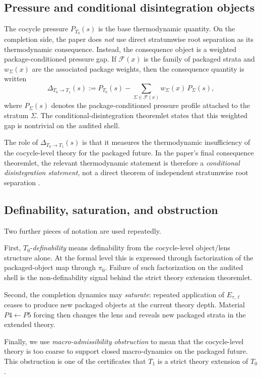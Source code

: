 \documentclass[11pt]{article}
\theoremstyle{definition}
\newcommand{\Tzero}{T_0}
\newcommand{\Tone}{T_1}
\begin{document}
\subsection{Pressure and conditional disintegration objects}

The cocycle pressure \(P_{\Tzero}(s)\) is the base thermodynamic quantity. On the completion side, the paper does \emph{not} use direct stratumwise root separation as its thermodynamic consequence. Instead, the consequence object is a weighted package-conditioned pressure gap. If \(\mathcal{F}(x)\) is the family of packaged strata and \(w_{\Sigma}(x)\) are the associated package weights, then the consequence quantity is written
\[
\Delta_{\Tzero\to \Tone}(s)
:=
P_{\Tzero}(s)-\sum_{\Sigma\in\mathcal{F}(x)} w_{\Sigma}(x)\,P_{\Sigma}(s),
\]
where \(P_{\Sigma}(s)\) denotes the package-conditioned pressure profile attached to the stratum \(\Sigma\). The conditional-disintegration theoremlet states that this weighted gap is nontrivial on the audited shell.

The role of \(\Delta_{\Tzero\to \Tone}(s)\) is that it measures the thermodynamic insufficiency of the cocycle-level theory for the packaged future. In the paper’s final consequence theoremlet, the relevant thermodynamic statement is therefore a \emph{conditional disintegration statement}, not a direct theorem of independent stratumwise root separation \cite{Rokhlin1949FundamentalIdeas}.

\subsection{Definability, saturation, and obstruction}

Two further pieces of notation are used repeatedly.

First, \(\Tzero\)-\emph{definability} means definability from the cocycle-level object/lens structure alone. At the formal level this is expressed through factorization of the packaged-object map through \(\pi_0\). Failure of such factorization on the audited shell is the non-definability signal behind the strict theory extension theoremlet.

Second, the completion dynamics may \emph{saturate}: repeated application of \(E_{\tau,\ell}\) ceases to produce new packaged objects at the current theory depth. Material \(P4\leftarrow P5\) forcing then changes the lens and reveals new packaged strata in the extended theory.

Finally, we use \emph{macro-admissibility obstruction} to mean that the cocycle-level theory is too coarse to support closed macro-dynamics on the packaged future. This obstruction is one of the certificates that \(\Tone\) is a strict theory extension of \(\Tzero\).
\end{document}
